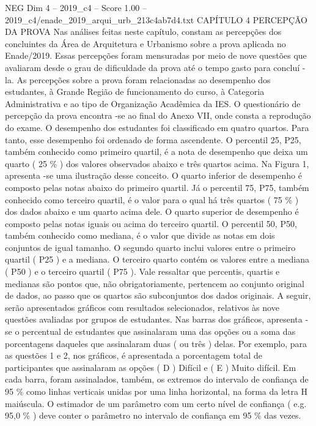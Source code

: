 \begin{textsample}{NEG Dim 4 – 2019\_c4 – Score 1.00 – 2019\_c4/enade\_2019\_arqui\_urb\_213c4ab7d4.txt}  \label{ex:f4_neg_239}
CAPÍTULO 4 PERCEPÇÃO DA PROVA Nas análises feitas neste capítulo, constam as percepções dos concluintes da Área de Arquitetura e Urbanismo sobre a prova aplicada no Enade/2019.
Essas percepções foram mensuradas por meio de nove questões que avaliaram desde o grau de dificuldade da prova até o tempo gasto para concluí -la.
As percepções sobre a prova foram relacionadas ao desempenho dos estudantes, à Grande Região de funcionamento do curso, à Categoria Administrativa e ao tipo de Organização Acadêmica da IES.
O questionário de percepção da prova encontra -se ao final do Anexo VII, onde consta a reprodução do exame.
O desempenho dos estudantes foi classificado em quatro quartos.
Para tanto, esse desempenho foi ordenado de forma ascendente.
O percentil 25, P25, também conhecido como primeiro quartil, é a nota de desempenho que deixa um quarto ( 25 \% ) dos valores observados abaixo e três quartos acima.
Na Figura 1, apresenta -se uma ilustração desse conceito.
O quarto inferior de desempenho é composto pelas notas abaixo do primeiro quartil.
Já o percentil 75, P75, também conhecido como terceiro quartil, é o valor para o qual há três quartos ( 75 \% ) dos dados abaixo e um quarto acima dele.
O quarto superior de desempenho é composto pelas notas iguais ou acima do terceiro quartil.
O percentil 50, P50, também conhecido como mediana, é o valor que divide as notas em dois conjuntos de igual tamanho.
O segundo quarto inclui valores entre o primeiro quartil ( P25 ) e a mediana.
O terceiro quarto contém os valores entre a mediana ( P50 ) e o terceiro quartil ( P75 ).
Vale ressaltar que percentis, quartis e medianas são pontos que, não obrigatoriamente, pertencem ao conjunto original de dados, ao passo que os quartos são subconjuntos dos dados originais.
A seguir, serão apresentados gráficos com resultados selecionados, relativos às nove questões avaliadas por grupos de estudantes.
Nas barras dos gráficos, apresenta -se o percentual de estudantes que assinalaram uma das opções ou a soma das porcentagens daqueles que assinalaram duas ( ou três ) delas.
Por exemplo, para as questões 1 e 2, nos gráficos, é apresentada a porcentagem total de participantes que assinalaram as opções ( D ) Difícil e ( E ) Muito difícil.
Em cada barra, foram assinalados, também, os extremos do intervalo de confiança de 95 \% como linhas verticais unidas por uma linha horizontal, na forma da letra H maiúscula.
O estimador de um parâmetro com um certo nível de confiança ( e.g. 95,0 \% ) deve conter o parâmetro no intervalo de confiança em 95 \% das vezes.

\end{textsample}
